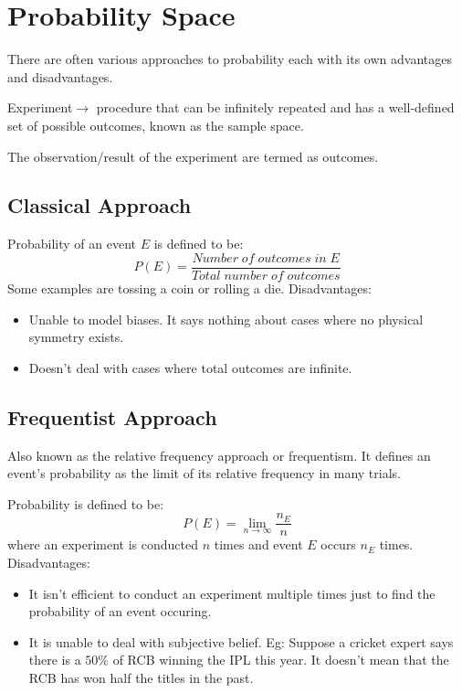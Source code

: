 \documentclass{article}
\begin{document}
\section{Probability Space}
There are often various approaches to probability each with its own advantages
and disadvantages.

Experiment$\rightarrow$ procedure that can be infinitely repeated and has a
well-defined set of possible outcomes, known as the sample space.

The observation/result of the experiment are termed as outcomes.

\subsection{Classical Approach}
        Probability of an event $E$ is defined to be: $$P(E)=\frac{Number\; of\;
         outcomes\;in\; E}{Total\; number\; of\; outcomes}$$
         Some examples are tossing a coin or rolling a die.
         Disadvantages:
         \begin{itemize}
             \item Unable to model biases. It says nothing about cases where no
             physical symmetry exists.
             \item Doesn't deal with cases where total outcomes are infinite.
         \end{itemize}

         \subsection{Frequentist Approach}
         Also known as the relative frequency approach or frequentism. It defines
         an event's probability as the limit of its relative frequency in many
         trials.

         Probability is defined to be:
         $$ P(E)=\lim_{n \to \infty} \frac{n_E}{n}$$
         where an experiment is conducted $n$ times and event $E$ occurs $n_E$
         times.
         Disadvantages:
         \begin{itemize}
             \item It isn't efficient to conduct an experiment multiple times
             just to find the probability of an event occuring.
             \item It is unable to deal with subjective belief. Eg: Suppose a
             cricket expert says there is a $50\%$ of RCB winning the IPL this
             year. It doesn't mean that the RCB has won half the titles in the
             past.
         \end{itemize}
%
\end{document}
